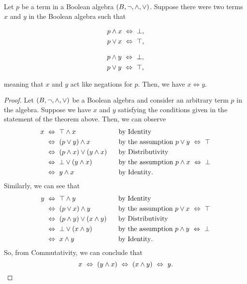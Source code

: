\begin{theorem}\label{thm:unique}
    Let $p$ be a term in a Boolean algebra $(B, \neg, \wedge, \vee)$.
    Suppose there were two terms $x$ and $y$ in the Boolean algebra such that
    \begin{center}
        \begin{minipage}{.2\linewidth}
            \begin{align*}
                p \wedge x &~\Leftrightarrow~ \bot,\\
                p \vee x &~\Leftrightarrow~ \top,
            \end{align*}
        \end{minipage}%
        \begin{minipage}{.2\linewidth}
            \begin{align*}
                p \wedge y &~\Leftrightarrow~ \bot,\\
                p \vee y &~\Leftrightarrow~ \top,
            \end{align*}
        \end{minipage}
    \end{center}
    meaning that $x$ and $y$ act like negations for $p$.
    Then, we have $x \iff y$.
\end{theorem}
\begin{proof}
    Let $(B, \neg, \wedge, \vee)$ be a Boolean algebra
    and consider an arbitrary term $p$ in the algebra.
    Suppose we have $x$ and $y$ satisfying the conditions given in the statement of the theorem above.
    Then, we can observe
    \begin{alignat*}{2}
        x &~\Leftrightarrow~ \top \wedge x ~~~~~~~~~~~~~~~~&&\text{by Identity}\\
          &~\Leftrightarrow~ (p \vee y) \wedge x &&\text{by the assumption $p \vee y ~\Leftrightarrow~ \top$}\\
          &~\Leftrightarrow~ (p \wedge x) \vee (y \wedge x) &&\text{by Distributivity}\\
          &~\Leftrightarrow~ \bot \vee (y \wedge x) &&\text{by the assumption $p \wedge x ~\Leftrightarrow~ \bot$}\\
          &~\Leftrightarrow~ y \wedge x &&\text{by Identity}.
    \end{alignat*}
    Similarly, we can see that
    \begin{alignat*}{2}
        y &~\Leftrightarrow~ \top \wedge y ~~~~~~~~~~~~~~~~&&\text{by Identity}\\
          &~\Leftrightarrow~ (p \vee x) \wedge y &&\text{by the assumption $p \vee x ~\Leftrightarrow~ \top$}\\
          &~\Leftrightarrow~ (p \wedge y) \vee (x \wedge y) &&\text{by Distributivity}\\
          &~\Leftrightarrow~ \bot \vee (x \wedge y) &&\text{by the assumption $p \wedge y ~\Leftrightarrow~ \bot$}\\
          &~\Leftrightarrow~ x \wedge y &&\text{by Identity}.
    \end{alignat*}
    So, from Commutativity, we can conclude that
    \begin{equation*}
        x ~\Leftrightarrow~ (y \wedge x) ~\Leftrightarrow~ (x \wedge y) ~\Leftrightarrow~ y.
    \end{equation*}
\end{proof}

